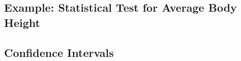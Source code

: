 \documentclass[11pt]{article}
\theoremstyle{definition}
\begin{document}
\subsection{Example: Statistical Test for Average Body Height}



\subsection{Confidence Intervals}
\end{document}
